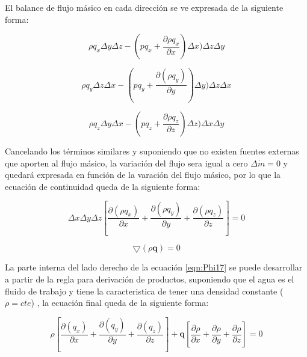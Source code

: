 El balance de flujo másico en cada dirección se ve expresada de la siguiente forma:

\begin{equation}
\label{eqn:Phi15}
\rho{q_{x}}\Delta{y}\Delta{z}-(pq_{x}+\dfrac{\partial{\rho{q_{x}}}}{\partial{x}})\Delta{x})\Delta{z}\Delta{y} 
\end{equation} 

\begin{equation}
\label{eqn:Phi16}
\rho{q_{y}}\Delta{z}\Delta{x}-(pq_{y}+\dfrac{\partial{(\rho{q_{y}})}}{\partial{y}})\Delta{y})\Delta{z}\Delta{x}  
\end{equation}

\begin{equation}
\label{eqn:Phi17}
\rho{q_{z}}\Delta{y}\Delta{x}-(pq_{z}+\dfrac{\partial{\rho{q_{z}}}}{\partial{z}})\Delta{z})\Delta{x}\Delta{y}  
\end{equation}  

Cancelando los términos similares y suponiendo que no existen fuentes externas que aporten al flujo másico, la variación del flujo sera igual a cero $\Delta{\dot{m}=0}$ y quedará expresada en función de la varación del flujo másico, por lo que la ecuación de continuidad queda de la siguiente forma:

\begin{equation}
\label{eqn:Phi17}
\Delta{x}\Delta{y}\Delta{z}[\dfrac{\partial(\rho{q_{x}})}{\partial{x}}+\dfrac{\partial(\rho{q_{y}})}{\partial{y}}+\dfrac{\partial(\rho{q_{z}})}{\partial{z}}]=0
\end{equation} 

\begin{equation}
\label{eqn:phi18}
\bigtriangledown(\rho\textbf{q})=0
\end{equation}

La parte interna del lado derecho de la ecuación \ref{eqn:Phi17} se puede desarrollar a partir de la regla para derivación de productos, suponiendo que el agua es el fluido de trabajo y tiene la caracteristica de tener una densidad constante ($\rho=cte$) , la ecuación final queda de la siguiente forma:

\begin{equation}
\label{eqn:phi19}                                                             \rho[\dfrac{\partial(q_{x})}{\partial{x}}+\dfrac{\partial(q_{y})}{\partial{y}}+\dfrac{\partial(q_{z})}{\partial{z}}]+\textbf{q}[\dfrac{\partial{\rho}}{\partial{x}}+\dfrac{\partial{\rho}}{\partial{y}}+\dfrac{\partial{\rho}}{\partial{z}}]=0
\end{equation}

